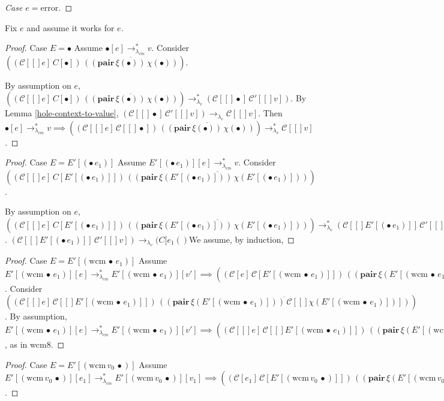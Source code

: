 \documentclass[ms,electronic,twosidetoc,letterpaper,chaptercenter,parttop]{byumsphd}
\newcommand{\pair}[2]{((\mathbf{pair}\,#1)\,#2)}
\newcommand{\eval}[1]{\overline{#1}}
\newcommand{\lvrr}{\rightarrow_{\lambda_v}}
\newcommand{\lvrrs}{\rightarrow_{\lambda_v}^{*}}
\newcommand{\cmrrs}{\rightarrow_{\lambda_{cm}}^{*}}
\newcommand{\C}[1]{\mathcal{C}[#1]}
\newcommand{\Cp}[1]{\mathcal{C}'[#1]}
\newcommand{\app}[2]{(#1\,#2)}
\newcommand{\wcm}[2]{(\mathrm{wcm}\,#1\,#2)}
\newcommand{\hole}{\bullet}
\begin{document}
\begin{proof}[Case $e=\mathrm{error}$]
\end{proof}

Fix $e$ and assume it works for $e$.

\begin{proof}{Case $E=\hole$}
Assume $\hole[e]\cmrrs v$. Consider $((\C[e]\,C[\hole])\,\eval{\pair{\xi(\hole)}{\chi(\hole)}})$.

By assumption on $e$, $((\C[e]\,C[\hole])\,\eval{\pair{\xi(\hole)}{\chi(\hole)}})\lvrrs (\C[\hole]\,\Cp[v])$.
By Lemma \ref{hole-context-to-value}, $(\C[\hole]\,\Cp[v])\lvrr\C[v]$.
Then $\hole[e]\cmrrs v\implies((\C[e]\,\C[\hole])\,\eval{\pair{\xi(\hole)}{\chi(\hole)}})\lvrrs \C[v]$.
\end{proof}

\begin{proof}{Case $E=E'[\app{\hole}{e_1}]$}
Assume $E'[\app{\hole}{e_1}][e]\cmrrs v$. Consider $((\C[e]\,C[E'[\app{\hole}{e_1}]])\,\eval{\pair{\xi(E'[\app{\hole}{e_1}])}{\chi(E'[\app{\hole}{e_1}])}})$.

By assumption on $e$, $((\C[e]\,C[E'[\app{\hole}{e_1}]])\,\eval{\pair{\xi(E'[\app{\hole}{e_1}])}{\chi(E'[\app{\hole}{e_1}])}})\lvrrs (\C[E'[\app{\hole}{e_1}]]\,\Cp[v])$. $(\C[E'[\app{\hole}{e_1}]]\,\Cp[v])\lvrr(C[e_1()$We assume, by induction, 
\end{proof}

\begin{proof}{Case $E=E'[\wcm{\hole}{e_1}]$}
Assume $E'[\wcm{\hole}{e_1}][e]\cmrrs E'[\wcm{\hole}{e_1}][v']\implies\app{\app{\C{e}}{\C{E'[\wcm{\hole}{e_1}]}}}{\eval{\pair{\xi(E'[\wcm{\hole}{e_1}])}{\C{\chi(E'[\wcm{\hole}{e_1}])}}}}\lvrrs\app{\C{E'[\wcm{\hole}{e_1}]}}{\Cp{v'}}$.
Consider $((\C[e]\,\C[E'[\wcm{\hole}{e_1}]])\,\eval{\pair{\xi(E'[\wcm{\hole}{e_1}])}{\C[\chi(E'[\wcm{\hole}{e_1}])]}})$.
By assumption, $E'[\wcm{\hole}{e_1}][e]\cmrrs E'[\wcm{\hole}{e_1}][v']\implies((\C[e]\,\C[E'[\wcm{\hole}{e_1}]])\,\eval{\pair{\xi(E'[\wcm{\hole}{e_1}])}{\C[\chi(E'[\wcm{\hole}{e_1}])]}})\lvrr(\C[E'[\wcm{\hole}{e_1}]]\,\Cp[v'])$, as in wcm8.


\end{proof}

\begin{proof}{Case $E=E'[\wcm{v_0}{\hole}]$}
Assume $E'[\wcm{v_0}{\hole}][e_1]\cmrrs E'[\wcm{v_0}{\hole}][v_1]\implies\app{\app{\C{e_1}}{\C{E'[\wcm{v_0}{\hole}]}}}{\eval{\pair{\xi(E'[\wcm{v_0}{\hole}])}{\C{\chi(E'[\wcm{v_0}{\hole}])}}}}\lvrrs\app{\C{E'[\wcm{v_0}{\hole}]}}{\C{v_1}}$.
\end{proof}
\end{document}
